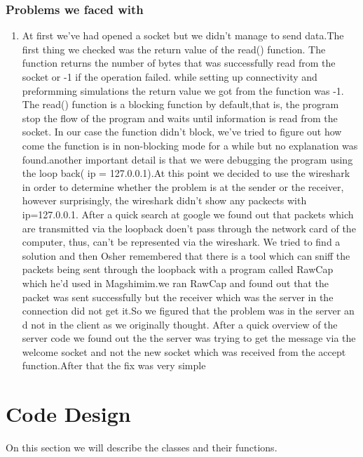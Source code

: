 \documentclass[12pt]{article}
\begin{document}
\subsubsection{Problems we faced with}
\begin{enumerate}
	\item 
	At first we’ve had opened a socket but we didn’t manage to send data.The first thing we checked was the return value of the read() function. The function returns the number of bytes that was successfully read from the socket or -1 if the operation failed. while setting up connectivity and preformming simulations the return value we got from the function was -1. The read() function is a blocking function by default,that is, the program stop the flow of the program and waits until information is read from the socket. In our case the function didn’t block, we’ve tried to figure out how come the function is in non-blocking mode for a while but no explanation was found.another important detail is that we were debugging the program using the loop back( ip = 127.0.0.1).At this point we decided to use the wireshark in order to determine whether the problem is at the sender or the receiver, however surprisingly, the wireshark didn’t show any packects with ip=127.0.0.1. After a quick search at google we found out that packets which are transmitted via the loopback doen’t pass through the network card of the computer, thus, can’t be represented via the wireshark. We tried to find a solution and then Osher remembered that there is a tool which can sniff the packets being sent through the loopback with a program called RawCap which he’d used in Magshimim.we ran RawCap and found out that the packet was sent successfully but the receiver which was the server in the connection did not get it.So we figured that the problem was in the server an d not in the client as we originally thought. After a quick overview of the server code we found out the the server was trying to get the message via the welcome socket and not the new socket which was received from the accept function.After that the fix was very simple
	
\end{enumerate}
\pagebreak
\section{Code Design}
On this section we will describe the classes and their functions.
\end{document}
